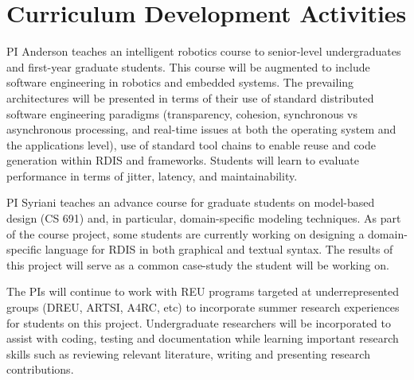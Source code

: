 
\section{Curriculum Development Activities}\label{sec:curriculum}


PI Anderson teaches an intelligent robotics course to senior-level undergraduates and first-year graduate students.  This course will be augmented to include software engineering in robotics and embedded systems.  The prevailing architectures will be presented in terms of their use of standard distributed software engineering paradigms (transparency, cohesion, synchronous vs asynchronous processing, and real-time issues at both the operating system and the applications level), use of standard tool chains to enable reuse and code generation within RDIS and frameworks.  Students will learn to evaluate performance in terms of jitter, latency, and maintainability.

PI Syriani teaches an advance course for graduate students on model-based design (CS 691) and, in particular, domain-specific modeling techniques.  As part of the course project, some students are currently working on designing a domain-specific language for RDIS in both graphical and textual syntax. The results of this project will serve as a common case-study the student will be working on. 

The PIs will continue to work with REU programs targeted at underrepresented groups (DREU, ARTSI, A4RC, etc) to incorporate summer research experiences for students on this project.  Undergraduate researchers will be incorporated to assist with coding, testing and documentation while learning important research skills such as reviewing relevant literature, writing and presenting research contributions.